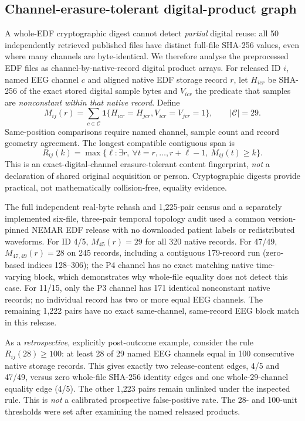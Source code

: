 \subsection{Channel-erasure-tolerant digital-product graph}
\label{sec:p2-erasure-tolerant-graph}
A whole-EDF cryptographic digest cannot detect
\emph{partial} digital reuse: all 50 independently
retrieved published files have distinct full-file
SHA-256 values, even where many channels are
byte-identical. We therefore analyse the
preprocessed EDF files as channel-by-native-record
digital product arrays. For released ID $i$,
named EEG channel $c$ and aligned native EDF
storage record $r$, let $H_{icr}$ be SHA-256 of
the exact stored digital sample bytes and
$V_{icr}$ the predicate that samples are
\emph{nonconstant within that native record}.
Define
\[
M_{ij}(r)=
\sum_{c\in\mathcal C}
\mathbf{1}\{H_{icr}=H_{jcr},
V_{icr}=V_{jcr}=1\},\qquad |\mathcal C|=29.
\]
Same-position comparisons require named channel,
sample count and record geometry agreement.
The longest compatible contiguous span is
\[
R_{ij}(k)=\max\{\ell:
\exists r,\ \forall t=r,\ldots,r+\ell-1,\
M_{ij}(t)\ge k\}.
\]
This is an exact-digital-channel erasure-tolerant
content fingerprint, \emph{not} a declaration of
shared original acquisition or person.
Cryptographic digests provide practical,
not mathematically collision-free, equality evidence.

The full independent real-byte rehash and
1,225-pair census and a separately implemented
six-file, three-pair temporal topology audit
used a common version-pinned NEMAR EDF release
with no downloaded patient labels or redistributed
waveforms. For ID 4/5, $M_{45}(r)=29$ for all
320 native records. For 47/49,
$M_{47,49}(r)=28$ on 245 records, including
a contiguous 179-record run (zero-based
indices 128--306); the P4 channel has
no exact matching native time-varying block,
which demonstrates why whole-file equality
does not detect this case. For 11/15, only
the P3 channel has 171 identical nonconstant
native records; no individual record has
two or more equal EEG channels. The remaining
1,222 pairs have no exact same-channel,
same-record EEG block match in this release.

As a \emph{retrospective}, explicitly
post-outcome example, consider the rule
$R_{ij}(28)\ge 100$: at least 28 of 29
named EEG channels equal in 100 consecutive
native storage records. This gives exactly
two release-content edges, 4/5 and 47/49,
versus zero whole-file SHA-256 identity
edges and one whole-29-channel equality
edge (4/5). The other 1,223 pairs
remain unlinked under the inspected rule.
This is \emph{not} a calibrated prospective
false-positive rate. The 28- and 100-unit
thresholds were set after examining the
named released products.

